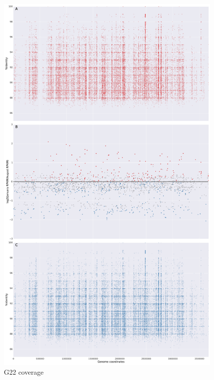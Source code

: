 \begin{figure}[!hbtp]
  \centering
  \includegraphics[width=\textwidth,height=\textheight,keepaspectratio]{Chapter5/Figures/coverage_plots/G22_coverage.pdf}
  \caption{G22 coverage}
  \label{G22coverage}
\end{figure}

